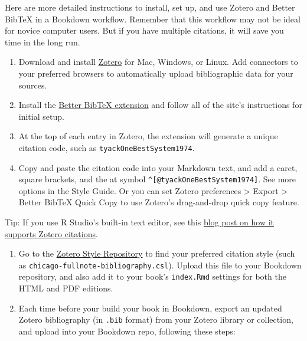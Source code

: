 \documentclass[
  english,
]{book}
\begin{document}
Here are more detailed instructions to install, set up, and use Zotero and Better BibTeX in a Bookdown workflow. Remember that this workflow may not be ideal for novice computer users. But if you have multiple citations, it will save you time in the long run.

\begin{enumerate}
\def\labelenumi{\arabic{enumi}.}
\item
  Download and install \href{https://zotero.org}{Zotero} for Mac, Windows, or Linux. Add connectors to your preferred browsers to automatically upload bibliographic data for your sources.
\item
  Install the \href{https://retorque.re/zotero-better-bibtex/installation/}{Better BibTeX extension} and follow all of the site's instructions for initial setup.
\item
  At the top of each entry in Zotero, the extension will generate a unique citation code, such as \texttt{tyackOneBestSystem1974}.
\item
  Copy and paste the citation code into your Markdown text, and add a caret, square brackets, and the at symbol \texttt{\^{}{[}@tyackOneBestSystem1974{]}}. See more options in the Style Guide. Or you can set Zotero preferences \textgreater{} Export \textgreater{} Better BibTeX Quick Copy to use Zotero's drag-and-drop quick copy feature.
\end{enumerate}

Tip: If you use R Studio's built-in text editor, see this \href{https://blog.rstudio.com/2020/11/09/rstudio-1-4-preview-citations/}{blog post on how it supports Zotero citations}.

\begin{enumerate}
\def\labelenumi{\arabic{enumi}.}
\setcounter{enumi}{4}
\item
  Go to the \href{https://www.zotero.org/styles}{Zotero Style Repository} to find your preferred citation style (such as \texttt{chicago-fullnote-bibliography.csl}). Upload this file to your Bookdown repository, and also add it to your book's \texttt{index.Rmd} settings for both the HTML and PDF editions.
\item
  Each time before your build your book in Bookdown, export an updated Zotero bibliography (in \texttt{.bib} format) from your Zotero library or collection, and upload into your Bookdown repo, following these steps:
\end{enumerate}
\end{document}
